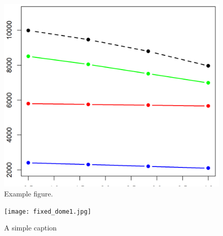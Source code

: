 \begin{figure}[H]
    \centering
        \includegraphics[scale=.6]{figures/example_figure.png}
        \caption{Example figure.}
    \label{fig:1}
\end{figure}

\begin{figure}[ht!]
\centering
\texttt{[image: fixed\_dome1.jpg]}
\caption{A simple caption \label{overflow}}
\end{figure}